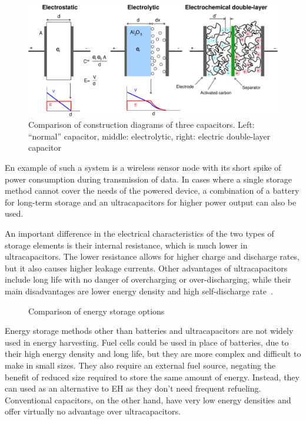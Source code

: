 \documentclass[a4paper,10pt]{article}
\begin{document}
\begin{figure}[h]
  \centering
  \includegraphics[width=.8\textwidth]{./Slike/Supercapacitor_diagram}
  \caption{Comparison of construction diagrams of three capacitors. Left: ``normal'' capacitor, middle: electrolytic, right: electric double-layer capacitor~\cite{wiki:edlc}}
  \label{fig:edlc-diagram}
\end{figure}

En example of such a system is a wireless sensor node with its short spike of power consumption during transmission of data. In cases where a single storage method cannot cover the needs of the powered device, a combination of a battery for long-term storage and an ultracapacitors for higher power output can also be used. 

An important difference in the electrical characteristics of the two types of storage elements is their internal resistance, which is much lower in ultracapacitors. The lower resistance allows for higher charge and discharge rates, but it also causes higher leakage currents. Other advantages of ultracapacitors include long life with no danger of overcharging or over-discharging, while their main disadvantages are lower energy density and high self-discharge rate~\cite{wiki:edlc}. 

\begin{figure}[!h]
\centering
\def\svgwidth{0.8\textwidth}
 
\caption{Comparison of energy storage options~\cite{wiki:edlc}}
\label{fig:storage-chart}
\end{figure}

Energy storage methods other than batteries and ultracapacitors are not widely used in energy harvesting. Fuel cells could be used in place of batteries, due to their high energy density and long life, but they are more complex and difficult to make in small sizes. They also require an external fuel source, negating the benefit of reduced size required to store the same amount of energy. Instead, they can used as an alternative to \ac{EH} as they don't need frequent refueling. Conventional capacitors, on the other hand, have very low energy densities and offer virtually no advantage over ultracapacitors. 
\end{document}
